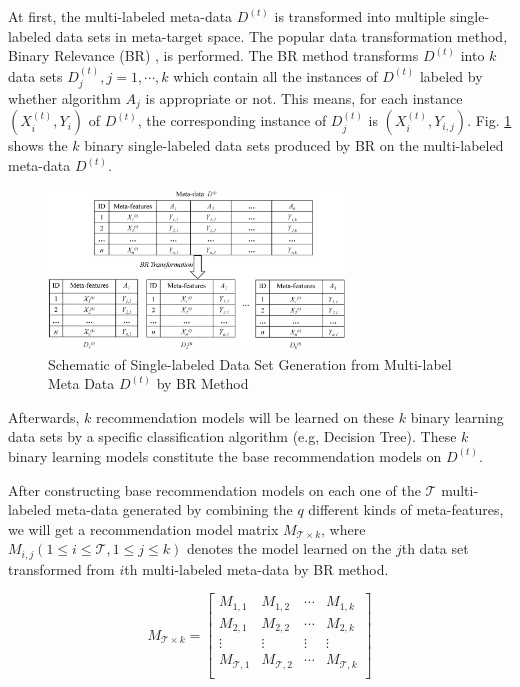 \documentclass[acmsmall]{acmart}
\begin{document}
At first, the multi-labeled meta-data $D^{(t)}$ is transformed into
multiple single-labeled data sets in meta-target space. The popular
data transformation method, Binary Relevance (BR)
\cite{tsoumakas2010mining}, is performed. The BR method transforms
$D^{(t)}$ into $k$ data sets $D_{j}^{(t)}, j= 1,\cdots,k$ which contain all
the instances of $D^{(t)}$ labeled by whether algorithm $A_j$ is
appropriate or not. This means, for each instance $(X_i^{(t)}, Y_i)$ of
$D^{(t)}$, the corresponding instance of $D_{j}^{(t)}$ is $(X_i^{(t)}, Y_{i,j})$.
Fig. \ref{Fig:dataTransformation} shows the $k$ binary
single-labeled data sets produced by BR on the multi-labeled
meta-data $D^{(t)}$.
\begin{figure}[!h]
	\centering
	\includegraphics[width=0.7\textwidth]{Figures/DataTransformation}
	\caption{Schematic of Single-labeled Data Set Generation from Multi-label Meta Data $D^{(t)}$ by BR Method}\label{Fig:dataTransformation}
\end{figure}

Afterwards, $k$ recommendation models will be learned on these $k$
binary learning data sets by a specific classification algorithm
(e.g, Decision Tree). These $k$ binary learning models constitute
the base recommendation models on $D^{(t)}$.

After constructing base recommendation models on each one of the $\mathcal{T}$
multi-labeled meta-data generated by combining the $q$ different
kinds of meta-features, we will get a recommendation model matrix
$M_{\mathcal{T}\times k}$, where $M_{i,j} (1\leq i\leq \mathcal{T}, 1\leq j \leq k)$
denotes the model learned on the $j$th data set transformed from
$i$th multi-labeled meta-data by BR method.

\begin{equation}
M_{\mathcal{T}\times k} =\left[
\begin{array}{cccc}
M_{1,1} & M_{1,2} & \cdots & M_{1,k} \\
M_{2,1} & M_{2,2} & \cdots & M_{2,k} \\
\vdots & \vdots &  \vdots & \vdots \\
M_{\mathcal{T},1} & M_{\mathcal{T},2} & \cdots & M_{\mathcal{T},k} \\
\end{array}
\right]
\end{equation}
\end{document}
